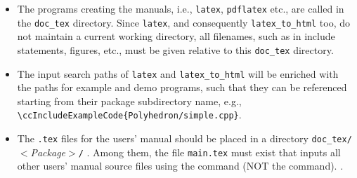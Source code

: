 \begin{itemize}
   \item The programs creating the manuals, i.e., \texttt{latex},
         \texttt{pdflatex} etc.,
         are called in the \texttt{doc\_tex} directory. Since
         \texttt{latex}, and consequently \texttt{latex\_to\_html}
         too, do not maintain a current working directory, all
         filenames, such as in include statements, figures, etc., must
         be given relative to this \texttt{doc\_tex} directory.
   \item The input search paths of \texttt{latex} and
         \texttt{latex\_to\_html} will be enriched with the paths for
         example and demo programs, such that they can be referenced
         starting from their package subdirectory name, e.g.,
         \verb|\ccIncludeExampleCode{Polyhedron/simple.cpp}|.
   \item The {\tt .tex} files for the users' manual%
          should be placed in a
         directory \verb|doc_tex/|$<${\em Package}$>$\verb|/|%
         . Among
         them, the file {\tt main.tex}%
         must exist that inputs all other users'
         manual source files using the \verb|| command (NOT the
         \verb|| command).%
         .


\end{itemize}
